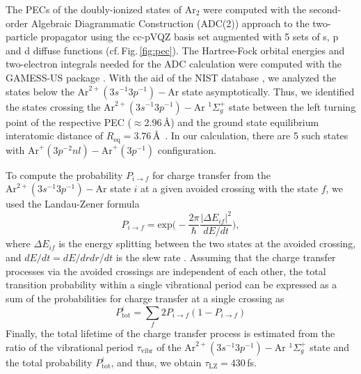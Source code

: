\documentclass[%
 aip,
rsi,%
 amsmath,amssymb,
preprint,%
]{revtex4-1}
\begin{document}
The PECs of the doubly-ionized states of Ar$_2$ were computed with the second-order Algebraic Diagrammatic Construction (ADC(2)) approach to the two-particle propagator \citep{sch84:267,velkov11:154113} using the cc-pVQZ basis set \citep{Woon93:1358} augmented with 5 sets of s, p and d diffuse functions \citep{bs_aug} (cf.\,Fig.\,\ref{fig:pec}). The Hartree-Fock orbital energies and two-electron integrals needed for the ADC calculation were computed with the GAMESS-US package \citep{gus}. With the aid of the NIST database \citep{nist17}, we analyzed the states below the $\mathrm{Ar}^{2+}(3s^{-1} 3p^{-1}) - \mathrm{Ar}$ state asymptotically. Thus, we identified the states crossing the $\mathrm{Ar}^{2+}(3s^{-1} 3p^{-1}) - \mathrm{Ar}$ $^1\Sigma^{+}_{g}$ state between the left turning point of the respective PEC ($\approx$2.96\,\AA) and the ground state equilibrium interatomic distance of $R_{\text{eq}}=3.76$\,\AA~\citep{herman88:4535}. %
In our calculation, there are 5 such states with $\mathrm{Ar}^{+}(3p^{-2}nl)-\mathrm{Ar}^+(3p^{-1})$ configuration. %

To compute the probability $P_{i \rightarrow f}$ for charge transfer from the $\mathrm{Ar}^{2+}(3s^{-1} 3p^{-1}) - \mathrm{Ar}$ state $i$ at a given avoided crossing with the state $f$, we used the Landau-Zener formula
%
\begin{equation}
P_{i \rightarrow f} = \text{exp}\bigg(-\frac{2\pi}{\hbar}\frac{|\Delta E_{if}|^2}{dE/dt}\bigg),
\end{equation}
%
where $\Delta E_{if}$ is the energy splitting between the two states at the avoided crossing, and $dE/dt = dE/dr dr/dt$ is the slew rate \cite{landau1932,zener1932,stueckelberg2009}. Assuming that the charge transfer processes via the avoided crossings are independent of each other, the total transition probability within a single vibrational period can be expressed as a sum of the probabilities for charge transfer at a single crossing as
\begin{equation}
P^{i}_{\text{tot}} = \sum_{f} 2 P_{i \rightarrow f} (1 - P_{i \rightarrow f})
\end{equation}
Finally, the total lifetime of the charge transfer process is estimated from the ratio of the vibrational period $\tau_{\text{vibr}}$ of the $\mathrm{Ar}^{2+}(3s^{-1} 3p^{-1}) - \mathrm{Ar}$ $^1\Sigma^{+}_{g}$ state and the total probability $P^{i}_{\text{tot}}$, and thus, we obtain $\tau_{\text{LZ}} =430$\,fs.
\end{document}
